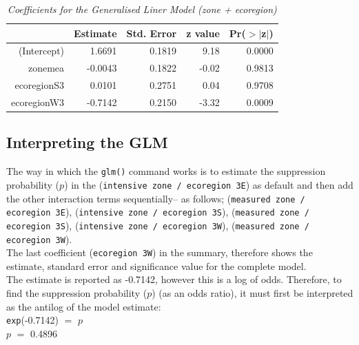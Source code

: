 \begin{spacing}{1.5}
\begin{table}[ht]
\begin{center}
\begin{tabular}{r|rrrr}
  \hline
 & Estimate & Std. Error & z value & Pr($>$$|$z$|$) \\ 
  \hline
(Intercept) & 1.6691 & 0.1819 & 9.18 & 0.0000 \\ 
  zonemea & -0.0043 & 0.1822 & -0.02 & 0.9813 \\ 
  ecoregionS3 & 0.0101 & 0.2751 & 0.04 & 0.9708 \\ 
  ecoregionW3 & -0.7142 & 0.2150 & -3.32 & 0.0009 \\ 
   \hline
\end{tabular}
\caption[Coefficients for the GLM (zone + ecoregion)]{\emph{Coefficients for the Generalised Liner Model (zone + ecoregion)}}
\label{tab5}
\end{center}
\end{table}

\subsection{Interpreting the GLM}

The way in which the \texttt{glm()} command works is to estimate the suppression probability ($p$) in the (\texttt{intensive zone / ecoregion 3E}) as default and then add the other interaction terms sequentially-- as follows; (\texttt{measured zone / ecoregion 3E}), (\texttt{intensive zone / ecoregion 3S}), (\texttt{measured zone / ecoregion 3S}), (\texttt{intensive zone / ecoregion 3W}), (\texttt{measured zone / ecoregion 3W}). \\

\noindent The last coefficient (\texttt{ecoregion 3W}) in the summary, therefore shows the estimate, standard error and significance value for the complete model. \\

\noindent The estimate is reported as -0.7142, however this is a log of odds. Therefore, to find the suppression probability ($p$) (as an odds ratio), it must first be interpreted as the antilog of the model estimate: \\

\noindent \texttt{exp}(-0.7142) $=$ $p$\\

\noindent $p$ $=$ 0.4896 \\
                

\end{spacing}
